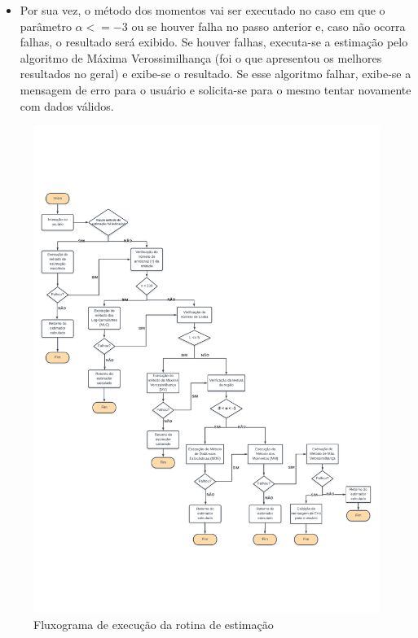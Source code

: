 \begin{itemize}
    \item Por sua vez, o método dos momentos vai ser executado no caso em que o parâmetro $\alpha <= -3$ ou se houver falha no passo anterior e, caso não ocorra falhas, o resultado será exibido. Se houver falhas, executa-se a estimação pelo algoritmo de Máxima Verossimilhança (foi o que apresentou os melhores resultados no geral) e exibe-se o resultado. Se esse algoritmo falhar, exibe-se a mensagem de erro para o usuário e solicita-se para o mesmo tentar novamente com dados válidos.
    
\end{itemize}
\begin{figure}[H]
     \centering
     \includegraphics[scale=0.80]{plots/FluxogramaDeExecucao-A4.pdf}
     \caption{Fluxograma de execução da rotina de estimação}
     \label{fig1}
\end{figure}

